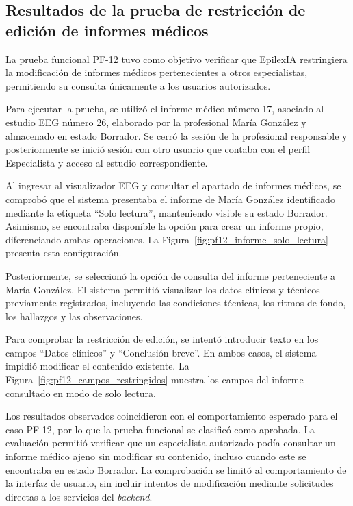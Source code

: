 \subsection{Resultados de la prueba de restricción de edición de informes médicos}

La prueba funcional PF-12 tuvo como objetivo verificar que EpilexIA restringiera la modificación de informes médicos pertenecientes a otros especialistas, permitiendo su consulta únicamente a los usuarios autorizados.

Para ejecutar la prueba, se utilizó el informe médico número 17, asociado al estudio EEG número 26, elaborado por la profesional María González y almacenado en estado Borrador. Se cerró la sesión de la profesional responsable y posteriormente se inició sesión con otro usuario que contaba con el perfil Especialista y acceso al estudio correspondiente.

Al ingresar al visualizador EEG y consultar el apartado de informes médicos, se comprobó que el sistema presentaba el informe de María González identificado mediante la etiqueta ``Solo lectura'', manteniendo visible su estado Borrador. Asimismo, se encontraba disponible la opción para crear un informe propio, diferenciando ambas operaciones. La Figura~\ref{fig:pf12_informe_solo_lectura} presenta esta configuración.

Posteriormente, se seleccionó la opción de consulta del informe perteneciente a María González. El sistema permitió visualizar los datos clínicos y técnicos previamente registrados, incluyendo las condiciones técnicas, los ritmos de fondo, los hallazgos y las observaciones.

Para comprobar la restricción de edición, se intentó introducir texto en los campos ``Datos clínicos'' y ``Conclusión breve''. En ambos casos, el sistema impidió modificar el contenido existente. La Figura~\ref{fig:pf12_campos_restringidos} muestra los campos del informe consultado en modo de solo lectura.

Los resultados observados coincidieron con el comportamiento esperado para el caso PF-12, por lo que la prueba funcional se clasificó como aprobada. La evaluación permitió verificar que un especialista autorizado podía consultar un informe médico ajeno sin modificar su contenido, incluso cuando este se encontraba en estado Borrador. La comprobación se limitó al comportamiento de la interfaz de usuario, sin incluir intentos de modificación mediante solicitudes directas a los servicios del \textit{backend}.


